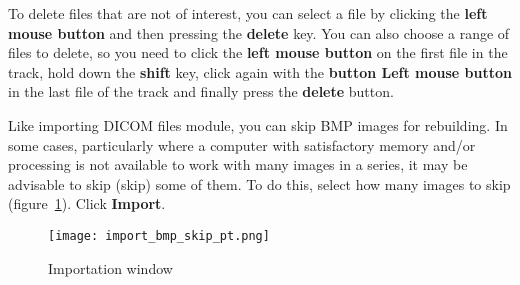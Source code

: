  
To delete files that are not of interest, you can select a file by clicking the \textbf{left mouse button} and then pressing the \textbf{delete} key. You can also choose a range of files to delete, so you need to click the \textbf{left mouse button} on the first file in the track, hold down the \textbf{shift} key, click again with the \textbf{button Left mouse button} in the last file of the track and finally press the \textbf{delete} button.
 

Like importing DICOM files module, you can skip BMP images for rebuilding. In some cases, particularly where a computer with satisfactory memory and/or processing is not available to work with many images in a series, it may be advisable to skip (skip) some of them. To do this, select how many images to skip (figure~\ref{fig:import_bmp_skip_pt}). Click \textbf{Import}.

\begin{figure}[!htb]
\centering
\texttt{[image: import\_bmp\_skip\_pt.png]}
\caption{Importation window}
\label{fig:import_bmp_skip_pt}
\end{figure}


